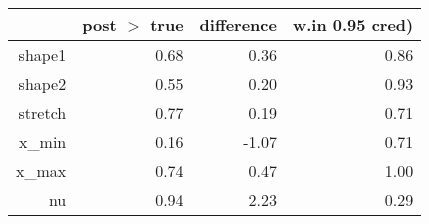 \begin{table}[ht]
\centering
\begin{tabular}{rrrr}
  \hline
 & post $>$ true & difference & w.in 0.95 cred) \\ 
  \hline
shape1 & 0.68 & 0.36 & 0.86 \\ 
  shape2 & 0.55 & 0.20 & 0.93 \\ 
  stretch & 0.77 & 0.19 & 0.71 \\ 
  x\_min & 0.16 & -1.07 & 0.71 \\ 
  x\_max & 0.74 & 0.47 & 1.00 \\ 
  nu & 0.94 & 2.23 & 0.29 \\ 
   \hline
\end{tabular}
\end{table}
